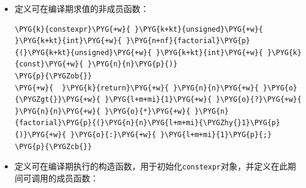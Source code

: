 \begin{itemize}
\item 定义可在编译期求值的非成员函数：



\begin{codeblockbg}
\begin{Verbatim}[commandchars=\\\{\},breaklines=true,breakanywhere=true,fontsize=\codefont,xleftmargin=17bp]
\PYG{k}{constexpr}\PYG{+w}{ }\PYG{k+kt}{unsigned}\PYG{+w}{ }\PYG{k+kt}{int}\PYG{+w}{ }\PYG{n+nf}{factorial}\PYG{p}{(}\PYG{k+kt}{unsigned}\PYG{+w}{ }\PYG{k+kt}{int}\PYG{+w}{ }\PYG{k}{const}\PYG{+w}{ }\PYG{n}{n}\PYG{p}{)}
\PYG{p}{\PYGZob{}}
\PYG{+w}{  }\PYG{k}{return}\PYG{+w}{ }\PYG{n}{n}\PYG{+w}{ }\PYG{o}{\PYGZgt{}}\PYG{+w}{ }\PYG{l+m+mi}{1}\PYG{+w}{ }\PYG{o}{?}\PYG{+w}{ }\PYG{n}{n}\PYG{+w}{ }\PYG{o}{*}\PYG{+w}{ }\PYG{n}{factorial}\PYG{p}{(}\PYG{n}{n}\PYG{l+m+mi}{\PYGZhy{}1}\PYG{p}{)}\PYG{+w}{ }\PYG{o}{:}\PYG{+w}{ }\PYG{l+m+mi}{1}\PYG{p}{;}
\PYG{p}{\PYGZcb{}}
\end{Verbatim}
\end{codeblockbg}



\item 定义可在编译期执行的构造函数，用于初始化\texttt{constexpr}对象，并定义在此期间可调用的成员函数：




\end{itemize}
